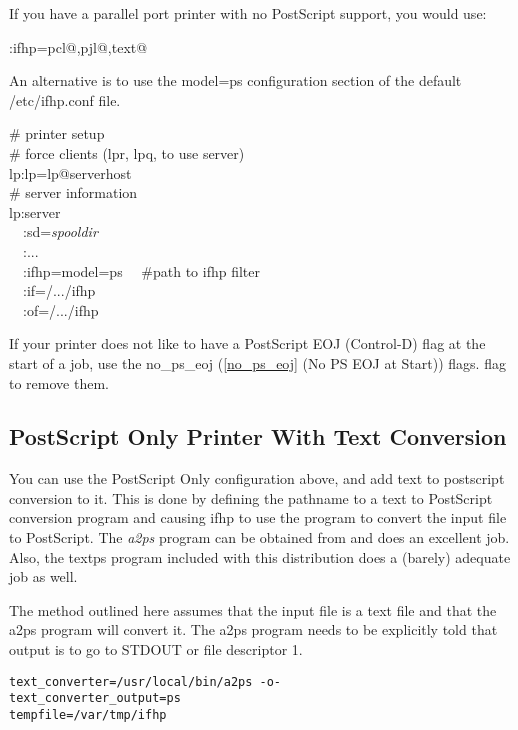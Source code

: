 \documentclass[a4paper]{article}
\begin{document}
If you have a parallel port printer with no PostScript support,
you would use:
\begin{tscreen}
:ifhp=pcl@,pjl@,text@
\end{tscreen}


An alternative is to use the
{\ttfamily model=ps}
configuration section of the default
{\ttfamily /etc/ifhp.conf} file.
\begin{tscreen}
\# printer setup  \\ 
\#  force clients (lpr, lpq, to use server)  \\ 
lp:lp=lp@serverhost  \\ 
\# server information  \\ 
lp:server  \\ 
~~:sd={\itshape spooldir\/}  \\ 
~~:...  \\ 
~~:ifhp=model=ps
~~\#path to ifhp filter  \\ 
~~:if=/.../ifhp  \\ 
~~:of=/.../ifhp  
\end{tscreen}


If your printer does not like to have a PostScript EOJ (Control-D)
flag at the start of a job,
use the
{\ttfamily no\_ps\_eoj}
(\ref{no_ps_eoj} {(No PS EOJ at Start)}) flags.
flag to remove them.


\subsection{PostScript Only Printer With Text Conversion}

You can use the PostScript Only configuration above,
and add text to postscript conversion to it.
This is done by defining the pathname to a text to PostScript
conversion program and causing ifhp to use the
program to convert the input file to PostScript.
The
{\itshape a2ps\/}
program can be obtained from
and does an excellent job.
Also,
the
{\ttfamily textps}
program included with this distribution does a (barely) adequate job as well.

The method outlined here assumes that the input file
is a text file and that the {\ttfamily a2ps} program will convert it.
The
{\ttfamily a2ps} program needs to be explicitly told that output
is to go to
{\ttfamily STDOUT} or file descriptor 1.
\begin{tscreen}
\begin{verbatim}
text_converter=/usr/local/bin/a2ps -o-
text_converter_output=ps
tempfile=/var/tmp/ifhp
\end{verbatim}
\end{tscreen}
\end{document}
